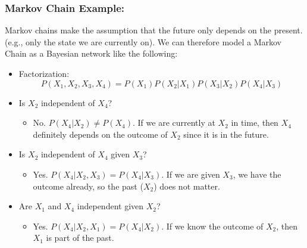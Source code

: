 \documentclass[10pt]{article}
\begin{document}
\subsubsection*{Markov Chain Example:}
Markov chains make the assumption that the future only depends on the present. (e.g., only the state we are currently on).  We can therefore model a Markov Chain as a Bayesian network like the following:
\begin{center}
\end{center}
\begin{itemize}
	\item Factorization: 
	\[P(X_1, X_2, X_3, X_4) = P(X_1) P(X_2 | X_1) P(X_3 | X_2) P(X_4 | X_3)\]
	\item Is $X_2$ independent of $X_4$?  
    \begin{itemize}
	    \item No.  $P(X_4 | X_2) \neq P(X_4)$.  If we are currently at $X_2$ in time, then $X_4$ definitely depends on the outcome of $X_2$ since it is in the future.
    \end{itemize}
	\item Is $X_2$ independent of $X_4$ given $X_3$? 
	\begin{itemize}
	    \item Yes.  $P(X_4 | X_2, X_3) = P(X_4 | X_3)$.  If we are given $X_3$, we have the outcome already, so the past ($X_2$) does not matter.
    \end{itemize}
	\item Are $X_1$ and $X_4$ independent given $X_2$?  
	\begin{itemize}
	    \item Yes.  $P(X_4 | X_2, X_1) = P(X_4 | X_2)$.  If we know the outcome of $X_2$, then $X_1$ is part of the past.
    \end{itemize}
\end{itemize}
\end{document}
